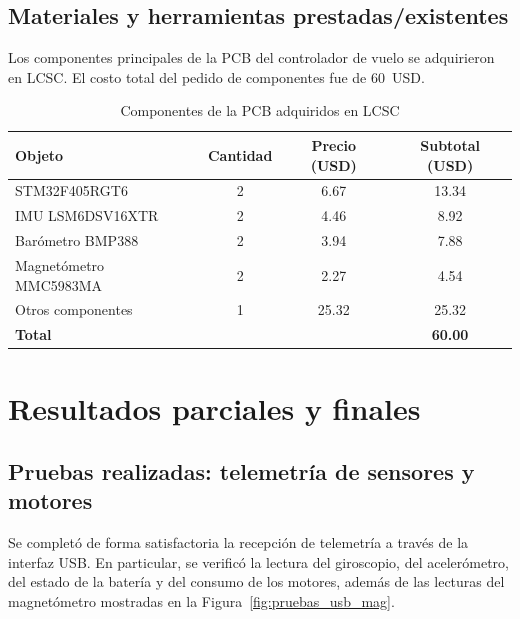 \documentclass[12pt, letterpaper]{report}
\begin{document}
\subsection{Materiales y herramientas prestadas/existentes}

Los componentes principales de la PCB del controlador de vuelo se adquirieron en LCSC. El costo total del pedido de componentes fue de 60~USD.

\begin{table}[htbp]
\centering
\caption{Componentes de la PCB adquiridos en LCSC}
\label{tab:componentes_pcb}
\renewcommand{\arraystretch}{1.3}
\setlength{\tabcolsep}{8pt}
\begin{tabularx}{\textwidth}{@{}Xccc@{}}
\toprule
\rowcolor{gray!20}
\textbf{Objeto} & \textbf{Cantidad} & \textbf{Precio (USD)} & \textbf{Subtotal (USD)} \\
\midrule
STM32F405RGT6 & 2 & 6.67 & 13.34 \\
IMU LSM6DSV16XTR & 2 & 4.46 & 8.92 \\
Barómetro BMP388 & 2 & 3.94 & 7.88 \\
Magnetómetro MMC5983MA & 2 & 2.27 & 4.54 \\
Otros componentes & 1 & 25.32 & 25.32 \\
\midrule
\textbf{Total} & & & \textbf{60.00} \\
\bottomrule
\end{tabularx}
\end{table}

\section{Resultados parciales y finales}

\subsection{Pruebas realizadas: telemetría de sensores y motores}

Se completó de forma satisfactoria la recepción de telemetría a través de la interfaz USB. En particular, se verificó la lectura del giroscopio, del acelerómetro, del estado de la batería y del consumo de los motores, además de las lecturas del magnetómetro mostradas en la Figura~\ref{fig:pruebas_usb_mag}.
\end{document}
